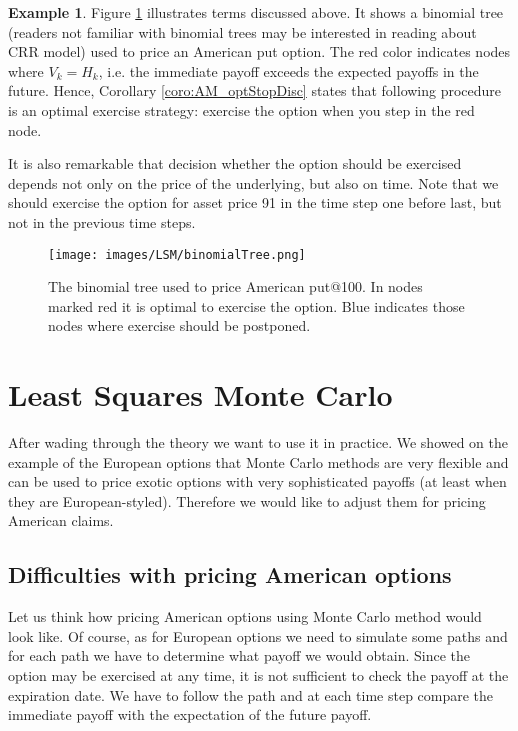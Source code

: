 \documentclass[a4paper,11pt, twoside]{book}
\theoremstyle{definition}
\newtheorem{example}{Example}[chapter]
\theoremstyle{remark}
\begin{document}
\begin{example}
 Figure \ref{fig:binTree} illustrates terms discussed above. It shows a binomial tree (readers not familiar with binomial trees may be interested in reading about CRR model) used to price an American put option. The red color indicates nodes where $V_{k} = H_{k}$, i.e. the immediate payoff exceeds the expected payoffs in the future. Hence, Corollary \ref{coro:AM_optStopDisc} states that following procedure is an optimal exercise strategy: exercise the option when you step in the red node.
 
 It is also remarkable that decision whether the option should be exercised depends not only on the price of the underlying, but also on time. Note that we should exercise the option for asset price 91 in the time step one before last, but not in the previous time steps.
\end{example}

\begin{figure}[!ht]
\centering
 \texttt{[image: images/LSM/binomialTree.png]}
\caption{The binomial tree used to price American put@100. In nodes marked red it is optimal to exercise the option. Blue indicates those nodes where exercise should be postponed. }
\label{fig:binTree}
\end{figure}

\section{Least Squares Monte Carlo}
After wading through the theory we want to use it in practice. We showed on the example of the European options that Monte Carlo methods are very flexible and can be used to price exotic options with very sophisticated payoffs (at least when they are European-styled). Therefore we would like to adjust them for pricing American claims. 

\subsection{Difficulties with pricing American options}

Let us think how pricing American options using Monte Carlo method would look like. Of course, as for European options we need to simulate some paths and for each path we have to determine what payoff we would obtain. Since the option may be exercised at any time, it is not sufficient to check the payoff at the expiration date. We have to follow the path and at each time step compare the immediate payoff with the expectation of the future payoff.
\end{document}
